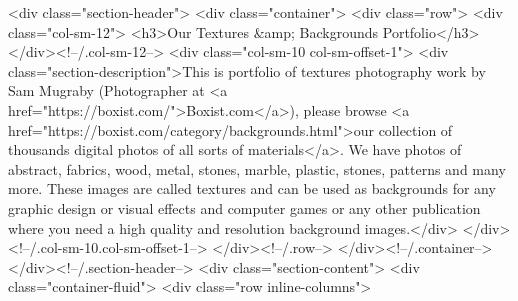 	
	
	
		<div class="section-header">
			<div class="container">
				<div class="row">
											<div class="col-sm-12">
							<h3>Our Textures &amp; Backgrounds Portfolio</h3>
						</div><!--/.col-sm-12-->
																<div class="col-sm-10 col-sm-offset-1">
							<div class="section-description">This is portfolio of textures photography work by Sam Mugraby (Photographer at <a href="https://boxist.com/">Boxist.com</a>), please browse <a href="https://boxist.com/category/backgrounds.html">our collection of thousands digital photos of all sorts of materials</a>. We have photos of abstract, fabrics, wood, metal, stones, marble, plastic, stones, patterns and many more. These images are called textures and can be used as backgrounds for any graphic design or visual effects and computer games or any other publication where you need a high quality and resolution background images.</div>
						</div><!--/.col-sm-10.col-sm-offset-1-->
									</div><!--/.row-->
			</div><!--/.container-->
		</div><!--/.section-header-->
		<div class="section-content">
		<div class="container-fluid">
			<div class="row inline-columns">
